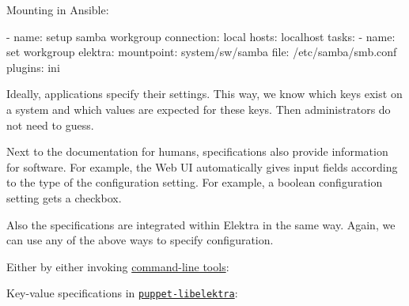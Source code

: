 

Mounting in Ansible\+:


\begin{DoxyCode}
- name: setup samba workgroup
  connection: local
  hosts: localhost
  tasks:
    - name: set workgroup
    elektra:
      mountpoint: system/sw/samba
      file: /etc/samba/smb.conf
      plugins: ini
\end{DoxyCode}


Ideally, applications specify their settings. This way, we know which keys exist on a system and which values are expected for these keys. Then administrators do not need to guess.

Next to the documentation for humans, specifications also provide information for software. For example, the Web UI automatically gives input fields according to the type of the configuration setting. For example, a boolean configuration setting gets a checkbox.

Also the specifications are integrated within Elektra in the same way. Again, we can use any of the above ways to specify configuration.

Either by either invoking \hyperlink{doc_help_kdb_md}{command-\/line tools}\+:




Key-\/value specifications in \href{https://puppet.libelektra.org}{\tt puppet-\/libelektra}\+:




